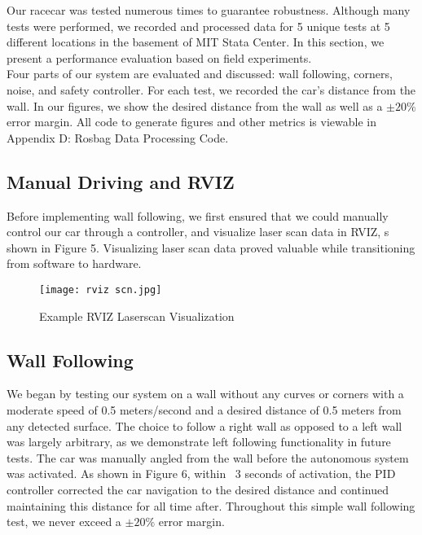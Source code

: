 \documentclass{article}
\begin{document}
Our racecar was tested numerous times to guarantee robustness. Although many tests were performed, we recorded and processed data for 5 unique tests at 5 different locations in the basement of MIT Stata Center. In this section, we present a performance evaluation based on field experiments.\\

Four parts of our system are evaluated and discussed: wall following, corners, noise, and safety controller. For each test, we recorded the car's distance from the wall. In our figures, we show the desired distance from the wall as well as a $\pm 20\%$ error margin. All code to generate figures and other metrics is viewable in Appendix D: Rosbag Data Processing Code.\\

\subsection{Manual Driving and RVIZ}
Before implementing wall following, we first ensured that we could manually control our car through a controller, and visualize laser scan data in RVIZ, s shown in Figure 5. Visualizing laser scan data proved valuable while transitioning from software to hardware. 

\begin{figure}[H]
\begin{center}
\texttt{[image: rviz scn.jpg]} %
\caption{Example RVIZ Laserscan Visualization}
\end{center}
\label{workflow}
\end{figure}

\subsection{Wall Following}
We began by testing our system on a wall without any curves or corners with a moderate speed of 0.5 meters/second and a desired distance of 0.5 meters from any detected surface. The choice to follow a right wall as opposed to a left wall was largely arbitrary, as we demonstrate left following functionality in future tests. The car was manually angled from the wall before the autonomous system was activated. As shown in Figure 6, within ~3 seconds of activation, the PID controller corrected the car navigation to the desired distance and continued maintaining this distance for all time after. Throughout this simple wall following test, we never exceed a $\pm 20\%$ error margin.\\
\end{document}
